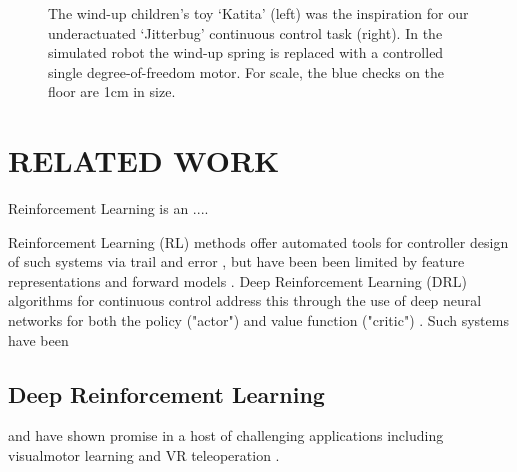 \documentclass[letterpaper, 10 pt, conference]{ieeeconf}
\begin{document}
\begin{figure}[ht]
    \caption{
        The wind-up children's toy `Katita' (left) was the inspiration for our underactuated `Jitterbug' continuous control task (right).
        In the simulated robot the wind-up spring is replaced with a controlled single degree-of-freedom motor.
        For scale, the blue checks on the floor are 1cm in size.
    }
    \label{fig:leader}
    
\end{figure}

\lipsum[1-4]

\section{RELATED WORK}


Reinforcement Learning is an ....  



Reinforcement Learning (RL) methods offer automated tools for controller design of such systems via trail and error \cite{sutton1998reinforcement}, but have been been limited by feature representations and forward models \cite{duan2016benchmarking}.  Deep Reinforcement Learning (DRL) algorithms for continuous control address this through the use of deep neural networks for both the policy ("actor") and value function ("critic") \cite{DDPG, SAC}.  Such systems have been  



\subsection{Deep Reinforcement Learning}


and have shown promise in a host of challenging applications including visualmotor learning \cite{finn2016deep} and VR teleoperation \cite{zhang2018deep}. 



\end{document}

